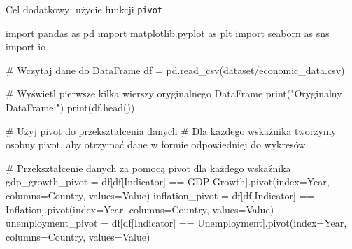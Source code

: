 \documentclass[
  polish,
  letterpaper,
  DIV=11,
  numbers=noendperiod]{scrreprt}
\newenvironment{Shaded}{\begin{snugshade}}{\end{snugshade}}
\newcommand{\BuiltInTok}[1]{\textcolor[rgb]{0.00,0.23,0.31}{#1}}
\newcommand{\CommentTok}[1]{\textcolor[rgb]{0.37,0.37,0.37}{#1}}
\newcommand{\ImportTok}[1]{\textcolor[rgb]{0.00,0.46,0.62}{#1}}
\newcommand{\NormalTok}[1]{\textcolor[rgb]{0.00,0.23,0.31}{#1}}
\newcommand{\OperatorTok}[1]{\textcolor[rgb]{0.37,0.37,0.37}{#1}}
\newcommand{\StringTok}[1]{\textcolor[rgb]{0.13,0.47,0.30}{#1}}
\begin{document}
Cel dodatkowy: użycie funkcji \texttt{pivot}

\begin{Shaded}
\begin{Highlighting}[]
\ImportTok{import}\NormalTok{ pandas }\ImportTok{as}\NormalTok{ pd}
\ImportTok{import}\NormalTok{ matplotlib.pyplot }\ImportTok{as}\NormalTok{ plt}
\ImportTok{import}\NormalTok{ seaborn }\ImportTok{as}\NormalTok{ sns}
\ImportTok{import}\NormalTok{ io}



\CommentTok{\# Wczytaj dane do DataFrame}
\NormalTok{df }\OperatorTok{=}\NormalTok{ pd.read\_csv(}\StringTok{\textquotesingle{}dataset/economic\_data.csv\textquotesingle{}}\NormalTok{)}

\CommentTok{\# Wyświetl pierwsze kilka wierszy oryginalnego DataFrame}
\BuiltInTok{print}\NormalTok{(}\StringTok{"Oryginalny DataFrame:"}\NormalTok{)}
\BuiltInTok{print}\NormalTok{(df.head())}

\CommentTok{\# Użyj pivot do przekształcenia danych}
\CommentTok{\# Dla każdego wskaźnika tworzymy osobny pivot, aby otrzymać dane w formie odpowiedniej do wykresów}

\CommentTok{\# Przekształcenie danych za pomocą pivot dla każdego wskaźnika}
\NormalTok{gdp\_growth\_pivot }\OperatorTok{=}\NormalTok{ df[df[}\StringTok{\textquotesingle{}Indicator\textquotesingle{}}\NormalTok{] }\OperatorTok{==} \StringTok{\textquotesingle{}GDP Growth\textquotesingle{}}\NormalTok{].pivot(index}\OperatorTok{=}\StringTok{\textquotesingle{}Year\textquotesingle{}}\NormalTok{, columns}\OperatorTok{=}\StringTok{\textquotesingle{}Country\textquotesingle{}}\NormalTok{, values}\OperatorTok{=}\StringTok{\textquotesingle{}Value\textquotesingle{}}\NormalTok{)}
\NormalTok{inflation\_pivot }\OperatorTok{=}\NormalTok{ df[df[}\StringTok{\textquotesingle{}Indicator\textquotesingle{}}\NormalTok{] }\OperatorTok{==} \StringTok{\textquotesingle{}Inflation\textquotesingle{}}\NormalTok{].pivot(index}\OperatorTok{=}\StringTok{\textquotesingle{}Year\textquotesingle{}}\NormalTok{, columns}\OperatorTok{=}\StringTok{\textquotesingle{}Country\textquotesingle{}}\NormalTok{, values}\OperatorTok{=}\StringTok{\textquotesingle{}Value\textquotesingle{}}\NormalTok{)}
\NormalTok{unemployment\_pivot }\OperatorTok{=}\NormalTok{ df[df[}\StringTok{\textquotesingle{}Indicator\textquotesingle{}}\NormalTok{] }\OperatorTok{==} \StringTok{\textquotesingle{}Unemployment\textquotesingle{}}\NormalTok{].pivot(index}\OperatorTok{=}\StringTok{\textquotesingle{}Year\textquotesingle{}}\NormalTok{, columns}\OperatorTok{=}\StringTok{\textquotesingle{}Country\textquotesingle{}}\NormalTok{, values}\OperatorTok{=}\StringTok{\textquotesingle{}Value\textquotesingle{}}\NormalTok{)}


\end{Highlighting}
\end{Shaded}
\end{document}
